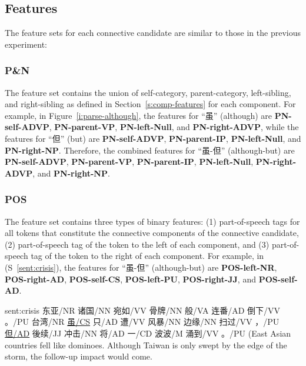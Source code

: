 \subsection{Features}

The feature sets for each connective candidate are similar to those in the previous
experiment:

\subsubsection{P\&N}

The feature set contains the union of self-category, parent-category, left-sibling,
and right-sibling as defined in Section~\ref{s:comp-features} for each component.
For example, in Figure~\ref{i:parse-although}, the features for ``虽'' (although) are
\textbf{PN-self-ADVP}, \textbf{PN-parent-VP}, \textbf{PN-left-Null}, and \textbf{PN-right-ADVP}, while
the features for ``但'' (but) are \textbf{PN-self-ADVP}, \textbf{PN-parent-IP}, \textbf{PN-left-Null},
and \textbf{PN-right-NP}. Therefore, the combined features for ``虽-但'' (although-but) are
\textbf{PN-self-ADVP}, \textbf{PN-parent-VP}, \textbf{PN-parent-IP}, \textbf{PN-left-Null},
\textbf{PN-right-ADVP}, and \textbf{PN-right-NP}.





\subsubsection{POS}

The feature set contains three types of binary features:
(1) part-of-speech tags for all tokens that constitute the connective components
of the connective candidate,
(2) part-of-speech tag of the token to the left of each component, and
(3) part-of-speech tag of the token to the right of each component. For example,
in (S~\ref{sent:crisis}), the features for ``虽-但'' (although-but) are
\textbf{POS-left-NR}, \textbf{POS-right-AD}, \textbf{POS-self-CS},
\textbf{POS-left-PU}, \textbf{POS-right-JJ}, and \textbf{POS-self-AD}.

\begin{sent}{sent:crisis}{}
    东亚/NR 诸国/NN 宛如/VV 骨牌/NN 般/VA 连番/AD 倒下/VV 。/PU
    台湾/NR \underline{虽/CS} 只/AD 遭/VV 风暴/NN 边缘/NN 扫过/VV ，/PU
    \underline{但/AD} 後续/JJ 冲击/NN 将/AD 一/CD 波波/M 涌到/VV 。/PU
    (East Asian countries fell like dominoes.
    Although Taiwan is only swept by the edge of the storm,
    the follow-up impact would come.
\end{sent}


